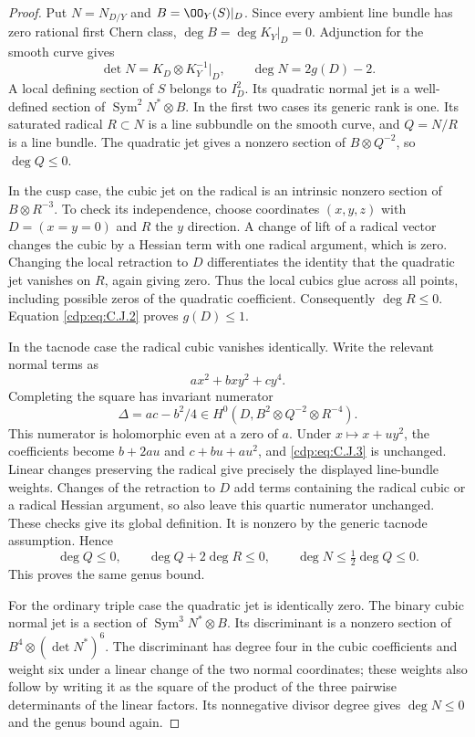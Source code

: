 \begin{proof}
Put $N=N_{D/Y}$ and $B=\OO_Y(S)|_D$. Since every ambient line bundle has zero rational first Chern class, $\deg B=\deg K_Y|_D=0$. Adjunction for the smooth curve gives
\[
 \det N=K_D\otimes K_Y^{-1}|_D,\qquad
 \deg N=2g(D)-2.                                      \tag{C.J.2}\label{cdp:eq:C.J.2}
\]
A local defining section of $S$ belongs to $I_D^2$. Its quadratic normal jet is a well-defined section of $\operatorname{Sym}^2N^*\otimes B$. In the first two cases its generic rank is one. Its saturated radical $R\subset N$ is a line subbundle on the smooth curve, and $Q=N/R$ is a line bundle. The quadratic jet gives a nonzero section of $B\otimes Q^{-2}$, so
$\deg Q\le0$.

In the cusp case, the cubic jet on the radical is an intrinsic nonzero section of $B\otimes R^{-3}$. To check its independence, choose coordinates $(x,y,z)$ with $D=(x=y=0)$ and $R$ the $y$ direction. A change of lift of a radical vector changes the cubic by a Hessian term with one radical argument, which is zero. Changing the local retraction to $D$ differentiates the identity that the quadratic jet vanishes on $R$, again giving zero. Thus the local cubics glue across all points, including possible zeros of the quadratic coefficient. Consequently $\deg R\le0$. Equation \eqref{cdp:eq:C.J.2} proves $g(D)\le1$.

In the tacnode case the radical cubic vanishes identically. Write the relevant normal terms as
\[
 a x^2+bxy^2+cy^4.
\]
Completing the square has invariant numerator
\[
 \Delta=ac-b^2/4\in
 H^0(D,B^2\otimes Q^{-2}\otimes R^{-4}).               \tag{C.J.3}\label{cdp:eq:C.J.3}
\]
This numerator is holomorphic even at a zero of $a$. Under $x\mapsto x+uy^2$, the coefficients become $b+2au$ and $c+bu+au^2$, and \eqref{cdp:eq:C.J.3} is unchanged. Linear changes preserving the radical give precisely the displayed line-bundle weights. Changes of the retraction to $D$ add terms containing the radical cubic or a radical Hessian argument, so also leave this quartic numerator unchanged. These checks give its global definition. It is nonzero by the generic tacnode assumption. Hence
\[
 \deg Q\le0,\qquad \deg Q+2\deg R\le0,
 \qquad \deg N\le\tfrac12\deg Q\le0.
\]
This proves the same genus bound.

For the ordinary triple case the quadratic jet is identically zero. The binary cubic normal jet is a section of $\operatorname{Sym}^3N^*\otimes B$. Its discriminant is a nonzero section of
$B^4\otimes(\det N^*)^6$. The discriminant has degree four in the cubic coefficients and weight six under a linear change of the two normal coordinates; these weights also follow by writing it as the square of the product of the three pairwise determinants of the linear factors. Its nonnegative divisor degree gives $\deg N\le0$ and the genus bound again.


\end{proof}
